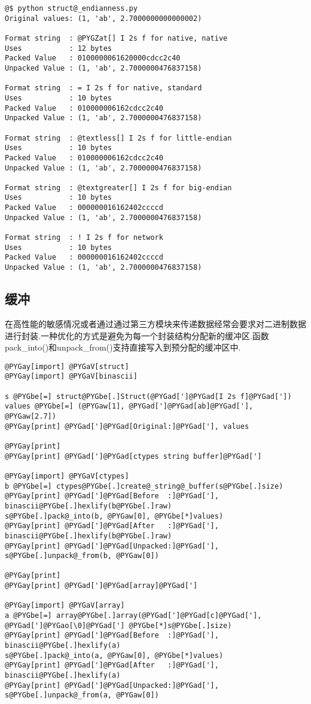 \documentclass[a4paper,10pt,english]{manual}
\begin{document}
\begin{Verbatim}[commandchars=@\[\]]
@$ python struct@_endianness.py
Original values: (1, 'ab', 2.7000000000000002)

Format string  : @PYGZat[] I 2s f for native, native
Uses           : 12 bytes
Packed Value   : 0100000061620000cdcc2c40
Unpacked Value : (1, 'ab', 2.7000000476837158)

Format string  : = I 2s f for native, standard
Uses           : 10 bytes
Packed Value   : 010000006162cdcc2c40
Unpacked Value : (1, 'ab', 2.7000000476837158)

Format string  : @textless[] I 2s f for little-endian
Uses           : 10 bytes
Packed Value   : 010000006162cdcc2c40
Unpacked Value : (1, 'ab', 2.7000000476837158)

Format string  : @textgreater[] I 2s f for big-endian
Uses           : 10 bytes
Packed Value   : 000000016162402ccccd
Unpacked Value : (1, 'ab', 2.7000000476837158)

Format string  : ! I 2s f for network
Uses           : 10 bytes
Packed Value   : 000000016162402ccccd
Unpacked Value : (1, 'ab', 2.7000000476837158)
\end{Verbatim}


\subsection{缓冲}

在高性能的敏感情况或者通过通过第三方模块来传递数据经常会要求对二进制数据进行封装.一种优化的方式是避免为每一个封装结构分配新的缓冲区.函数pack\_into()和unpack\_from()支持直接写入到预分配的缓冲区中.

\begin{Verbatim}[commandchars=@\[\]]
@PYGay[import] @PYGaV[struct]
@PYGay[import] @PYGaV[binascii]

s @PYGbe[=] struct@PYGbe[.]Struct(@PYGad[']@PYGad[I 2s f]@PYGad['])
values @PYGbe[=] (@PYGaw[1], @PYGad[']@PYGad[ab]@PYGad['], @PYGaw[2.7])
@PYGay[print] @PYGad[']@PYGad[Original:]@PYGad['], values

@PYGay[print]
@PYGay[print] @PYGad[']@PYGad[ctypes string buffer]@PYGad[']

@PYGay[import] @PYGaV[ctypes]
b @PYGbe[=] ctypes@PYGbe[.]create@_string@_buffer(s@PYGbe[.]size)
@PYGay[print] @PYGad[']@PYGad[Before  :]@PYGad['], binascii@PYGbe[.]hexlify(b@PYGbe[.]raw)
s@PYGbe[.]pack@_into(b, @PYGaw[0], @PYGbe[*]values)
@PYGay[print] @PYGad[']@PYGad[After   :]@PYGad['], binascii@PYGbe[.]hexlify(b@PYGbe[.]raw)
@PYGay[print] @PYGad[']@PYGad[Unpacked:]@PYGad['], s@PYGbe[.]unpack@_from(b, @PYGaw[0])

@PYGay[print]
@PYGay[print] @PYGad[']@PYGad[array]@PYGad[']

@PYGay[import] @PYGaV[array]
a @PYGbe[=] array@PYGbe[.]array(@PYGad[']@PYGad[c]@PYGad['], @PYGad[']@PYGao[\0]@PYGad['] @PYGbe[*]s@PYGbe[.]size)
@PYGay[print] @PYGad[']@PYGad[Before  :]@PYGad['], binascii@PYGbe[.]hexlify(a)
s@PYGbe[.]pack@_into(a, @PYGaw[0], @PYGbe[*]values)
@PYGay[print] @PYGad[']@PYGad[After   :]@PYGad['], binascii@PYGbe[.]hexlify(a)
@PYGay[print] @PYGad[']@PYGad[Unpacked:]@PYGad['], s@PYGbe[.]unpack@_from(a, @PYGaw[0])
\end{Verbatim}
\end{document}
